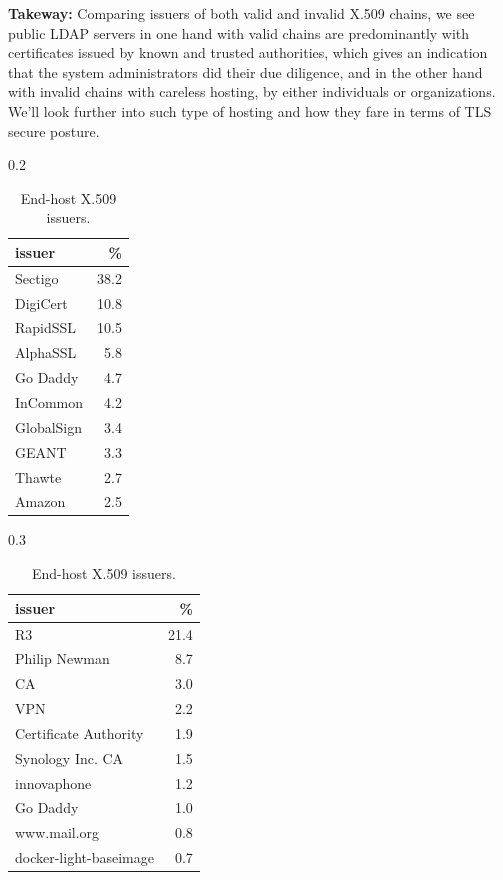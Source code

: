 \textbf{Takeway:} Comparing issuers of both valid and invalid X.509 chains, we see public LDAP servers in one hand with valid chains are predominantly with certificates issued by known and trusted authorities, which gives an indication that the system administrators did their due diligence, and in the other hand with invalid chains with careless hosting, by either individuals or organizations. We'll look further into such type of hosting and how they fare in terms of \gls{TLS} secure posture.
\begin{table}[!ht]
\small
    \begin{subtable}[h]{0.2\textwidth}
    \small
    \begin{tabular}{lr}
        \toprule
        issuer & \% \\
        \midrule
        Sectigo & 38.2 \\
        DigiCert & 10.8 \\
        RapidSSL & 10.5 \\
        AlphaSSL & 5.8 \\
        Go Daddy & 4.7 \\
        InCommon & 4.2 \\
        GlobalSign & 3.4 \\
        GEANT & 3.3 \\
        Thawte & 2.7 \\
        Amazon & 2.5 \\
        \bottomrule
    \end{tabular}
    \caption{Valid X.509 chains}
    \end{subtable}
    \hfill
    \begin{subtable}[h]{0.3\textwidth}
    \small
    \begin{tabular}{lr}
        \toprule
        issuer & \% \\
        \midrule
        R3 & 21.4 \\
        Philip Newman & 8.7 \\
        CA & 3.0 \\
        VPN & 2.2 \\
        Certificate Authority & 1.9 \\
        Synology Inc. CA & 1.5 \\
        innovaphone & 1.2 \\
        Go Daddy& 1.0 \\
        www.mail.org & 0.8 \\
        docker-light-baseimage & 0.7 \\
        \bottomrule
    \end{tabular}
    \caption{Invalid X.509 chains}
    \end{subtable}
    \caption{End-host X.509 issuers.}
    \label{tab:end_host_issuers}
\end{table}

